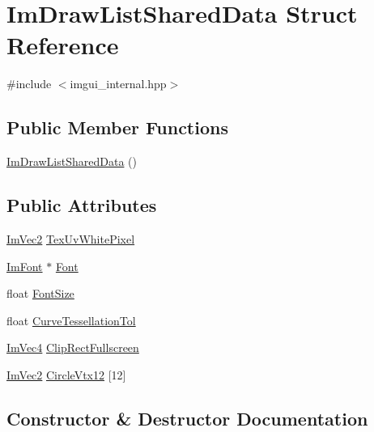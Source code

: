 \hypertarget{struct_im_draw_list_shared_data}{}\section{Im\+Draw\+List\+Shared\+Data Struct Reference}
\label{struct_im_draw_list_shared_data}


{\ttfamily \#include $<$imgui\+\_\+internal.\+hpp$>$}

\subsection*{Public Member Functions}
\begin{DoxyCompactItemize}
\item 
\hyperlink{struct_im_draw_list_shared_data_a3fe9d30c0df68cce4db9d2033ba9a589}{Im\+Draw\+List\+Shared\+Data} ()
\end{DoxyCompactItemize}
\subsection*{Public Attributes}
\begin{DoxyCompactItemize}
\item 
\hyperlink{struct_im_vec2}{Im\+Vec2} \hyperlink{struct_im_draw_list_shared_data_a8dff5fc643cab17128012383d75d9ad8}{Tex\+Uv\+White\+Pixel}
\item 
\hyperlink{struct_im_font}{Im\+Font} $\ast$ \hyperlink{struct_im_draw_list_shared_data_a4542431d4afe5320a965fbe52a3cc39f}{Font}
\item 
float \hyperlink{struct_im_draw_list_shared_data_a189a412fcd4f66a1d60501ad758d04bd}{Font\+Size}
\item 
float \hyperlink{struct_im_draw_list_shared_data_a5b5bb46f5fd714b43e4b73a131b7f6f7}{Curve\+Tessellation\+Tol}
\item 
\hyperlink{struct_im_vec4}{Im\+Vec4} \hyperlink{struct_im_draw_list_shared_data_ac8737a7aae92c55d75998a6c9f6f3882}{Clip\+Rect\+Fullscreen}
\item 
\hyperlink{struct_im_vec2}{Im\+Vec2} \hyperlink{struct_im_draw_list_shared_data_aca28baf42970650f5ee59c71dc905971}{Circle\+Vtx12} \mbox{[}12\mbox{]}
\end{DoxyCompactItemize}


\subsection{Constructor \& Destructor Documentation}
\hypertarget{struct_im_draw_list_shared_data_a3fe9d30c0df68cce4db9d2033ba9a589}{}\label{struct_im_draw_list_shared_data_a3fe9d30c0df68cce4db9d2033ba9a589} 

